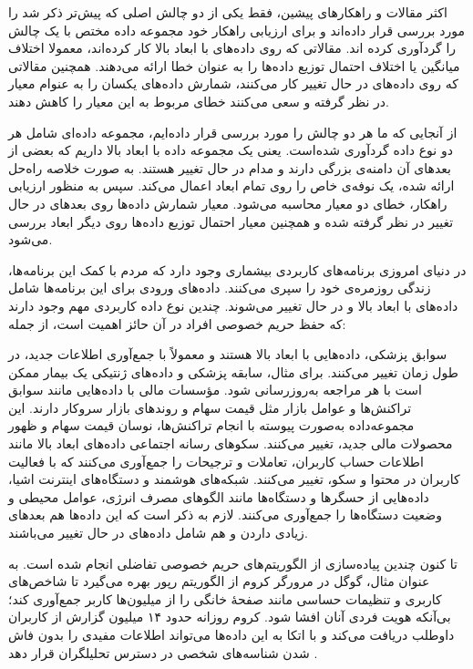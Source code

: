 
اکثر مقالات و راهکارهای پیشین، فقط یکی از دو چالش اصلی که پیش‌تر ذکر شد را مورد بررسی قرار داده‌اند و برای ارزیابی راهکار خود مجموعه داده مختص با یک چالش را گردآوری کرده اند. مقالاتی که روی داده‌های با ابعاد بالا کار کرده‌اند، معمولا اختلاف میانگین یا اختلاف احتمال توزیع داده‌ها را به عنوان خطا ارائه می‌دهند. همچنین مقالاتی که روی داده‌های در حال تغییر کار می‌کنند، شمارش داده‌های یکسان را به عنوام معیار در نظر گرفته و سعی می‌کنند خطای مربوط به این معیار را کاهش دهند.

از آنجایی که ما هر دو چالش را مورد بررسی قرار داده‌ایم، مجموعه داده‌ای شامل هر دو نوع داده گردآوری شده‌است. یعنی یک مجموعه داده با ابعاد بالا داریم که بعضی از بعدهای آن دامنه‌ی بزرگی دارند و مدام در حال تغییر هستند. به صورت خلاصه راه‌حل ارائه شده، یک نوفه‌ی خاص را روی تمام ابعاد اعمال می‌کند. سپس به منظور ارزیابی راهکار، خطای دو معیار محاسبه می‌شود. معیار شمارش داده‌ها روی بعدهای در حال تغییر در نظر گرفته شده و همچنین معیار احتمال توزیع داده‌ها روی دیگر ابعاد بررسی می‌شود. 


در دنیای امروزی برنامه‌های کاربردی بیشماری وجود دارد که مردم با کمک این برنامه‌ها، زندگی روزمره‌ی خود را سپری می‌کنند. داده‌های ورودی برای این برنامه‌ها شامل داده‌های با ابعاد بالا و در حال تغییر می‌شوند. چندین نوع داده کاربردی مهم وجود دارند که حفظ حریم خصوصی افراد در آن حائز اهمیت است، از جمله:

سوابق پزشکی، داده‌هایی با ابعاد بالا هستند و معمولاً با جمع‌آوری اطلاعات جدید، در طول زمان تغییر می‌کنند. برای مثال، سابقه پزشکی و داده‌های ژنتیکی یک بیمار ممکن است با هر مراجعه به‌روزرسانی شود.
مؤسسات مالی با داده‌هایی مانند سوابق تراکنش‌ها و عوامل بازار مثل قیمت سهام و روندهای بازار سروکار دارند. این مجموعه‌داده‌ به‌صورت پیوسته با انجام تراکنش‌ها، نوسان قیمت سهام و ظهور محصولات مالی جدید، تغییر می‌کنند.
سکو‌های رسانه‌ اجتماعی داده‌های ابعاد بالا مانند اطلاعات حساب کاربران، تعاملات و ترجیحات را جمع‌آوری می‌کنند که با فعالیت کاربران در محتوا و سکو، تغییر می‌کنند. 
شبکه‌های هوشمند و دستگاه‌های اینترنت اشیا، داده‌هایی از حسگرها و دستگاه‌ها مانند الگوهای مصرف انرژی، عوامل محیطی و وضعیت دستگاه‌ها را جمع‌آوری می‌کنند. لازم به ذکر است که این داده‌ها هم بعد‌های زیادی داردن و هم شامل داده‌های در حال تغییر می‌باشند.

تا کنون چندین پیاده‌سازی از الگوریتم‌های حریم خصوصی تفاضلی انجام شده است. به عنوان مثال، گوگل در مرورگر کروم از الگوریتم رپور بهره می‌گیرد تا شاخص‌های کاربری و تنظیمات حساسی مانند صفحهٔ خانگی را از میلیون‌ها کاربر جمع‌آوری کند؛ بی‌آنکه هویت فردی آنان افشا شود. کروم روزانه حدود ۱۴ میلیون گزارش از کاربران داوطلب دریافت می‌کند و با اتکا به این داده‌ها می‌تواند اطلاعات مفیدی را بدون فاش شدن شناسه‌های شخصی در دسترس تحلیلگران قرار دهد .

